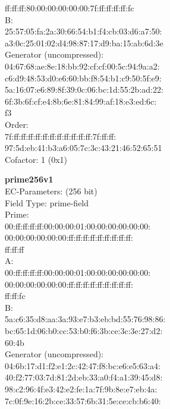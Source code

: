     ff:ff:ff:80:00:00:00:00:00:7f:ff:ff:ff:ff:fc\\
B:   \\
    25:57:05:fa:2a:30:66:54:b1:f4:cb:03:d6:a7:50:\\
    a3:0c:25:01:02:d4:98:87:17:d9:ba:15:ab:6d:3e\\
Generator (uncompressed):\\
    04:67:68:ae:8e:18:bb:92:cf:cf:00:5c:94:9a:a2:\\
    c6:d9:48:53:d0:e6:60:bb:f8:54:b1:c9:50:5f:e9:\\
    5a:16:07:e6:89:8f:39:0c:06:bc:1d:55:2b:ad:22:\\
    6f:3b:6f:cf:e4:8b:6e:81:84:99:af:18:e3:ed:6c:\\
    f3\\
Order: \\
    7f:ff:ff:ff:ff:ff:ff:ff:ff:ff:ff:ff:7f:ff:ff:\\
    97:5d:eb:41:b3:a6:05:7c:3c:43:21:46:52:65:51\\
Cofactor:  1 (0x1)\\
\item \textbf{ prime256v1 }\\
EC-Parameters: (256 bit)\\
Field Type: prime-field\\
Prime:\\
    00:ff:ff:ff:ff:00:00:00:01:00:00:00:00:00:00:\\
    00:00:00:00:00:00:ff:ff:ff:ff:ff:ff:ff:ff:ff:\\
    ff:ff:ff\\
A:   \\
    00:ff:ff:ff:ff:00:00:00:01:00:00:00:00:00:00:\\
    00:00:00:00:00:00:ff:ff:ff:ff:ff:ff:ff:ff:ff:\\
    ff:ff:fc\\
B:   \\
    5a:c6:35:d8:aa:3a:93:e7:b3:eb:bd:55:76:98:86:\\
    bc:65:1d:06:b0:cc:53:b0:f6:3b:ce:3c:3e:27:d2:\\
    60:4b\\
Generator (uncompressed):\\
    04:6b:17:d1:f2:e1:2c:42:47:f8:bc:e6:e5:63:a4:\\
    40:f2:77:03:7d:81:2d:eb:33:a0:f4:a1:39:45:d8:\\
    98:c2:96:4f:e3:42:e2:fe:1a:7f:9b:8e:e7:eb:4a:\\
    7c:0f:9e:16:2b:ce:33:57:6b:31:5e:ce:cb:b6:40:\\
